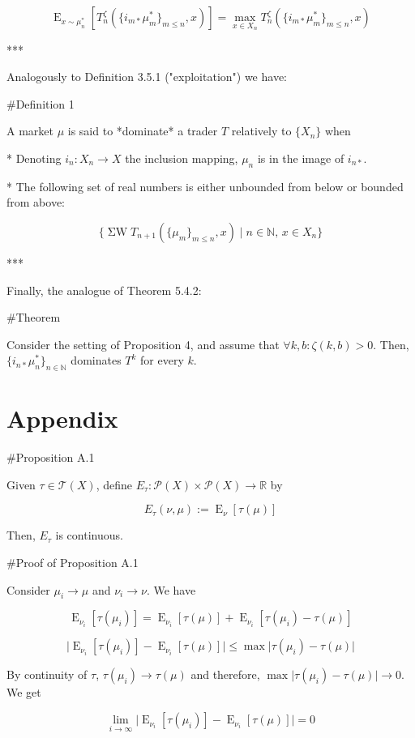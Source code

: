 \documentclass[a4paper]{article}
\DeclareMathOperator{\E}{E}
\newcommand{\Nats}{\mathbb{N}}
\newcommand{\Reals}{\mathbb{R}}
\newcommand{\Abs}[1]{\lvert #1 \rvert}
\newcommand{\Prob}{\mathcal{P}}
\newcommand{\T}{\mathcal{T}(X)}
\newcommand{\SW}{\operatorname{\Sigma W}}
\begin{document}
$$\E_{x \sim \mu^*_n}[T^\zeta_n(\{i_{m*}\mu^*_m\}_{m \leq n},x)] = \max_{x \in X_n} T^\zeta_n(\{i_{m*}\mu^*_m\}_{m \leq n},x)$$

***

Analogously to Definition 3.5.1 ("exploitation") we have:

\#Definition 1

A market ${\mu}$ is said to *dominate* a trader ${T}$ relatively to ${\{X_n\}}$ when

* Denoting ${i_n: X_n \rightarrow X}$ the inclusion mapping, ${\mu_n}$ is in the image of ${i_{n*}}$.

* The following set of real numbers is either unbounded from below or bounded from above:

$$\{\SW T_{n+1}(\{\mu_m\}_{m \leq n},x) \mid n \in \Nats,\, x \in X_n\}$$

***

Finally, the analogue of Theorem 5.4.2:

\#Theorem

Consider the setting of Proposition 4, and assume that ${\forall k,b: \zeta(k,b) > 0}$.  Then, ${\{i_{n*}\mu^*_n\}_{n \in \Nats}}$ dominates ${T^k}$ for every ${k}$.

\section{Appendix}

\#Proposition A.1

Given ${\tau \in \T}$, define ${E_\tau: \Prob(X) \times \Prob(X) \rightarrow \Reals}$ by

$$E_\tau(\nu,\mu):=\E_\nu[\tau(\mu)]$$

Then, ${E_\tau}$ is continuous.

\#Proof of Proposition A.1

Consider ${\mu_i \rightarrow \mu}$ and ${\nu_i \rightarrow \nu}$. We have

$$\E_{\nu_i}[\tau(\mu_i)] = \E_{\nu_i}[\tau(\mu)] + \E_{\nu_i}[\tau(\mu_i) - \tau(\mu)]$$

$$\Abs{\E_{\nu_i}[\tau(\mu_i)] - \E_{\nu_i}[\tau(\mu)]} \leq \max\Abs{\tau(\mu_i) - \tau(\mu)}$$

By continuity of ${\tau}$, ${\tau(\mu_i) \rightarrow \tau(\mu)}$ and therefore, $\max\Abs{\tau(\mu_i) - \tau(\mu)} \rightarrow 0$. We get

$$\lim_{i \rightarrow \infty} \Abs{\E_{\nu_i}[\tau(\mu_i)] - \E_{\nu_i}[\tau(\mu)]} = 0$$
\end{document}
